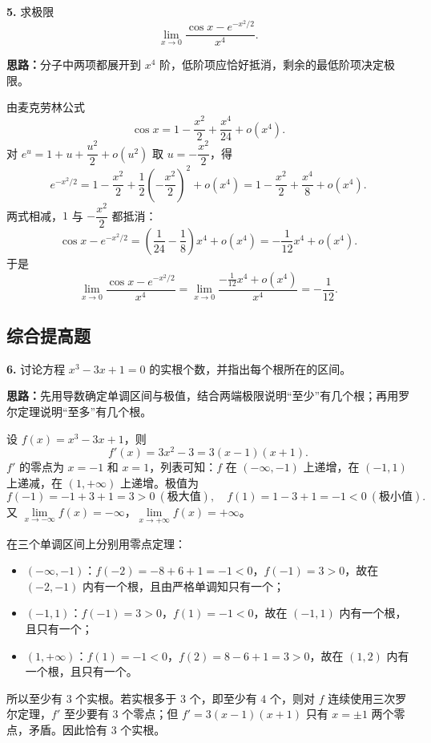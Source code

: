 \else \answerarea[8] \fi%

\textbf{5.} 求极限
\[
\lim_{x\to 0}\frac{\cos x-e^{-x^{2}/2}}{x^{4}}.
\]

\ifshowsolutions%
\textbf{思路：}分子中两项都展开到 $x^4$ 阶，低阶项应恰好抵消，剩余的最低阶项决定极限。

由麦克劳林公式
\[
\cos x=1-\frac{x^{2}}{2}+\frac{x^{4}}{24}+o(x^{4}).
\]
对 $e^{u}=1+u+\dfrac{u^{2}}{2}+o(u^{2})$ 取 $u=-\dfrac{x^{2}}{2}$，得
\[
e^{-x^{2}/2}=1-\frac{x^{2}}{2}+\frac{1}{2}\left(-\frac{x^{2}}{2}\right)^{2}+o(x^{4})
=1-\frac{x^{2}}{2}+\frac{x^{4}}{8}+o(x^{4}).
\]
两式相减，$1$ 与 $-\dfrac{x^{2}}{2}$ 都抵消：
\[
\cos x-e^{-x^{2}/2}
=\left(\frac{1}{24}-\frac18\right)x^{4}+o(x^{4})
=-\frac{1}{12}x^{4}+o(x^{4}).
\]
于是
\[
\lim_{x\to 0}\frac{\cos x-e^{-x^{2}/2}}{x^{4}}
=\lim_{x\to 0}\frac{-\frac{1}{12}x^{4}+o(x^{4})}{x^{4}}
=-\frac{1}{12}.
\]

\else \answerarea[8] \fi%

\subsection{综合提高题}

\textbf{6.} 讨论方程 $x^{3}-3x+1=0$ 的实根个数，并指出每个根所在的区间。

\ifshowsolutions%
\textbf{思路：}先用导数确定单调区间与极值，结合两端极限说明“至少”有几个根；再用罗尔定理说明“至多”有几个根。

设 $f(x)=x^{3}-3x+1$，则
\[
f'(x)=3x^{2}-3=3(x-1)(x+1).
\]
$f'$ 的零点为 $x=-1$ 和 $x=1$，列表可知：$f$ 在 $(-\infty,-1)$ 上递增，在 $(-1,1)$ 上递减，在 $(1,+\infty)$ 上递增。极值为
\[
f(-1)=-1+3+1=3>0\ (\text{极大值}),\quad
f(1)=1-3+1=-1<0\ (\text{极小值}).
\]
又 $\lim\limits_{x\to-\infty}f(x)=-\infty$，$\lim\limits_{x\to+\infty}f(x)=+\infty$。

在三个单调区间上分别用零点定理：
\begin{itemize}
\item $(-\infty,-1)$：$f(-2)=-8+6+1=-1<0$，$f(-1)=3>0$，故在 $(-2,-1)$ 内有一个根，且由严格单调知只有一个；
\item $(-1,1)$：$f(-1)=3>0$，$f(1)=-1<0$，故在 $(-1,1)$ 内有一个根，且只有一个；
\item $(1,+\infty)$：$f(1)=-1<0$，$f(2)=8-6+1=3>0$，故在 $(1,2)$ 内有一个根，且只有一个。
\end{itemize}
所以至少有 $3$ 个实根。若实根多于 $3$ 个，即至少有 $4$ 个，则对 $f$ 连续使用三次罗尔定理，$f'$ 至少要有 $3$ 个零点；但 $f'=3(x-1)(x+1)$ 只有 $x=\pm1$ 两个零点，矛盾。因此恰有 $3$ 个实根。

